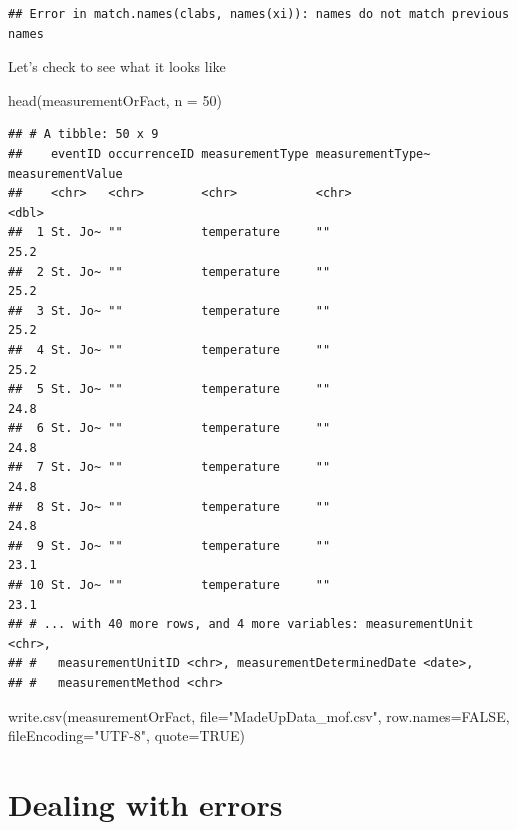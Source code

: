 \documentclass[
]{book}
\newenvironment{Shaded}{\begin{snugshade}}{\end{snugshade}}
\newcommand{\AttributeTok}[1]{\textcolor[rgb]{0.77,0.63,0.00}{#1}}
\newcommand{\ConstantTok}[1]{\textcolor[rgb]{0.00,0.00,0.00}{#1}}
\newcommand{\DecValTok}[1]{\textcolor[rgb]{0.00,0.00,0.81}{#1}}
\newcommand{\FunctionTok}[1]{\textcolor[rgb]{0.00,0.00,0.00}{#1}}
\newcommand{\NormalTok}[1]{#1}
\newcommand{\StringTok}[1]{\textcolor[rgb]{0.31,0.60,0.02}{#1}}
\begin{document}
\begin{verbatim}
## Error in match.names(clabs, names(xi)): names do not match previous names
\end{verbatim}

Let's check to see what it looks like

\begin{Shaded}
\begin{Highlighting}[]
\FunctionTok{head}\NormalTok{(measurementOrFact, }\AttributeTok{n =} \DecValTok{50}\NormalTok{)}
\end{Highlighting}
\end{Shaded}

\begin{verbatim}
## # A tibble: 50 x 9
##    eventID occurrenceID measurementType measurementType~ measurementValue
##    <chr>   <chr>        <chr>           <chr>                       <dbl>
##  1 St. Jo~ ""           temperature     ""                           25.2
##  2 St. Jo~ ""           temperature     ""                           25.2
##  3 St. Jo~ ""           temperature     ""                           25.2
##  4 St. Jo~ ""           temperature     ""                           25.2
##  5 St. Jo~ ""           temperature     ""                           24.8
##  6 St. Jo~ ""           temperature     ""                           24.8
##  7 St. Jo~ ""           temperature     ""                           24.8
##  8 St. Jo~ ""           temperature     ""                           24.8
##  9 St. Jo~ ""           temperature     ""                           23.1
## 10 St. Jo~ ""           temperature     ""                           23.1
## # ... with 40 more rows, and 4 more variables: measurementUnit <chr>,
## #   measurementUnitID <chr>, measurementDeterminedDate <date>,
## #   measurementMethod <chr>
\end{verbatim}

\begin{Shaded}
\begin{Highlighting}[]
\FunctionTok{write.csv}\NormalTok{(measurementOrFact, }\AttributeTok{file=}\StringTok{"MadeUpData\_mof.csv"}\NormalTok{, }\AttributeTok{row.names=}\ConstantTok{FALSE}\NormalTok{, }\AttributeTok{fileEncoding=}\StringTok{"UTF{-}8"}\NormalTok{, }\AttributeTok{quote=}\ConstantTok{TRUE}\NormalTok{)}
\end{Highlighting}
\end{Shaded}

\hypertarget{dealing-with-errors}{%
\chapter{Dealing with errors}\label{dealing-with-errors}}
\end{document}
